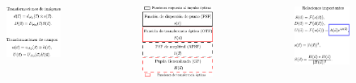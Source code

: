 \documentclass[xcolor=table,serif]{beamer}
\begin{document}
{\begin{columns}
  \begin{figure}
    \includegraphics[scale =.88]{Figures/presentation/transformations.pdf}
  \end{figure}
  \pause
  \begin{figure}
    \includegraphics[scale =.85]{Figures/presentation/definitions.pdf}
  \end{figure}
  \begin{figure}
    \includegraphics[scale =.85]{Figures/presentation/relations.pdf}
  \end{figure}
\end{columns}
}
\end{document}
